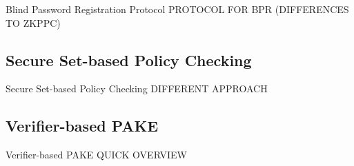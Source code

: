 \documentclass[notes,xcolor=dvipsnames]{beamer}
\begin{document}
\begin{frame}{Blind Password Registration Protocol}
  \alert{PROTOCOL FOR BPR (DIFFERENCES TO ZKPPC)}
\end{frame}

\subsection[SPC]{Secure Set-based Policy Checking}

\begin{frame}{Secure Set-based Policy Checking}
  \alert{DIFFERENT APPROACH}
\end{frame}

\subsection[VPAKE]{Verifier-based PAKE}

\begin{frame}{Verifier-based PAKE}
  \alert{QUICK OVERVIEW}
\end{frame}
\end{document}
